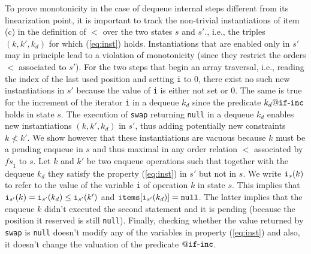 To prove monotonicity in the case of dequeue internal steps different from its linearization point, it is important to track the non-trivial instantiations of item (c) in the definition of $<$ over the two states $s$ and $s'$., i.e., the triples $(k,k',k_d)$ for which (\ref{eq:inst}) holds. Instantiations that are enabled only in $s'$ may in principle lead to a violation of monotonicity (since they restrict the orders $<$ associated to $s'$). For the two steps that begin an array traversal, i.e., reading the index of the last used position and setting {\tt i} to $0$, there exist no  such new instantiations in $s'$ because the value of {\tt i} is either not set or $0$. %
%
%
%
%
The same is true for the increment of the iterator {\tt i} in a dequeue $k_d$ since the predicate $k_d\atCP {\tt if}\text{-}{\tt inc}$ holds in state $s$.
The execution of {\tt swap} returning {\tt null} in a dequeue $k_d$ enables new instantiations $(k,k',k_d)$ in $s'$, thus adding potentially new constraints $k\not< k'$. We show however that these instantiations are vacuous because $k$ must be a pending enqueue in $s$ and thus maximal in any order relation $<$ associated by $\mathit{fs}_1$ to $s$.
Let $k$ and $k'$ be two enqueue operations such that together with the dequeue $k_d$ they satisfy the property (\ref{eq:inst}) in $s'$ but not in $s$. 
We write ${\tt i}_s(k)$ to refer to the value of the variable {\tt i} of operation $k$ in state $s$. 
This implies that ${\tt i}_{s'}(k) = {\tt i}_{s'}(k_d) \leq {\tt i}_{s'}(k')$ and ${\tt items}[{\tt i}_{s'}(k_d)]={\tt null}$. The latter implies that the enqueue $k$ didn't executed
the second statement and it is pending (because the position it reserved is still {\tt null}). Finally, checking whether the value returned by {\tt swap} is {\tt null} doesn't modify any of the variables in property  (\ref{eq:inst}) and also, it doesn't change the valuation of the predicate $\atCP {\tt if}\text{-}{\tt inc}$.

